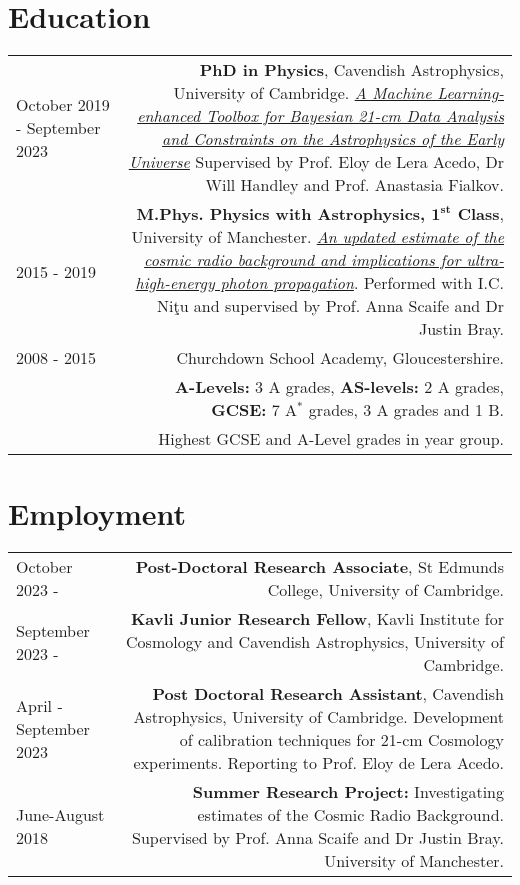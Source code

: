 \documentclass{article}
\begin{document}
\section*{Education}
\begin{tabular}{L!{\vrule}R}
	October 2019 - September 2023 & \textbf{PhD in Physics}, Cavendish Astrophysics, University of Cambridge. \href{https://github.com/htjb/Thesis}{\textit{A Machine Learning-enhanced Toolbox for Bayesian 21-cm Data Analysis and Constraints on the Astrophysics of the Early Universe}} Supervised by Prof. Eloy de Lera Acedo, Dr Will Handley and Prof. Anastasia Fialkov. \\
	2015 - 2019 & \textbf{M.Phys. Physics with Astrophysics, $\mathbf{1^{st}}$ Class}, University of Manchester. \href{https://www.sciencedirect.com/science/article/pii/S0927650520301043?via\%3Dihub}{\textit{An updated estimate of the cosmic radio background and implications for ultra-high-energy photon propagation}}. Performed with I.C. Ni\c{t}u and supervised by Prof. Anna Scaife and Dr Justin Bray. \\
	2008 - 2015 & Churchdown School Academy, Gloucestershire. \\ &\textbf{A-Levels:} 3 A grades, \textbf{AS-levels:} 2 A grades, \textbf{GCSE:} 7 A$^*$ grades, 3 A grades and 1 B. \\ & Highest GCSE and A-Level grades in year group.
\end{tabular}

\section*{Employment}
\begin{tabular}{L!{\vrule}R}
    October 2023 - & \textbf{Post-Doctoral Research Associate}, St Edmunds College, University of Cambridge. \\
    September 2023 - & \textbf{Kavli Junior Research Fellow}, Kavli Institute for Cosmology and Cavendish Astrophysics, University of Cambridge. \\
    April - September 2023 & \textbf{Post Doctoral Research Assistant}, Cavendish Astrophysics, University of Cambridge. Development of calibration techniques for 21-cm Cosmology experiments. Reporting to Prof. Eloy de Lera Acedo.\\
    June-August 2018 & \textbf{Summer Research Project:} Investigating estimates of the Cosmic Radio Background. Supervised by Prof. Anna Scaife and Dr Justin Bray. University of Manchester. \\
\end{tabular}
\end{document}
